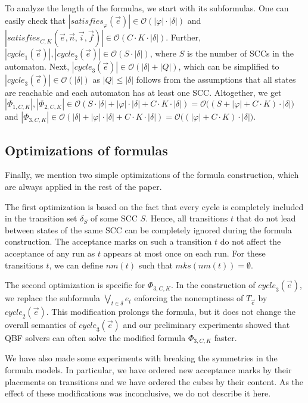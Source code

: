 \documentclass[a4paper,UKenglish,cleveref,autoref,thm-restate]{lipics-v2021}
\newcommand{\mks}{\mathit{mks}}
\newcommand{\rem}{\mathit{nm}}
\newcommand{\mcycle}{\mathit{cycle}}
\newcommand{\msat}{\mathit{satisfies}}
\newcommand{\Te}{T_{\vec{e}}}
\newcommand{\bigO}{\mathcal{O}}
\begin{document}
To analyze the length of the formulas, we start with its subformulas.
One can easily check that
$|\msat_\varphi(\vec{e})|\in\bigO(|\varphi|\cdot|\delta|)$ and
$|\msat_{C,K}(\vec{e},\vec{n},\vec{i},\vec{f})|\in\bigO(C\cdot
K\cdot|\delta|)$. Further,
$|\mcycle_1(\vec{e})|,|\mcycle_2(\vec{e})|\in\bigO(S\cdot|\delta|)$, %
where $S$ is the number of SCCs in the automaton.  Next,
$|\mcycle_3(\vec{e})|\in\bigO(|\delta|+|Q|)$, which can be simplified
to $|\mcycle_3(\vec{e})|\in\bigO(|\delta|)$ as $|Q|\le|\delta|$
follows from the assumptions that all states are reachable and each
automaton has at least one SCC. Altogether, we get
$|\Phi_{1,C,K}|,|\Phi_{2,C,K}|\in\bigO(S\cdot|\delta|+|\varphi|\cdot|\delta|+C\cdot
K\cdot|\delta|)=\bigO\big((S+|\varphi|+C\cdot K)\cdot|\delta|\big)$
and
$|\Phi_{3,C,K}|\in\bigO(|\delta|+|\varphi|\cdot|\delta|+C\cdot
K\cdot|\delta|)=\bigO\big((|\varphi|+C\cdot K)\cdot|\delta|\big)$.

\subsection{Optimizations of formulas}

Finally, we mention two simple optimizations of the formula
construction, which are always applied in the rest of the paper.

The first optimization is based on the fact that every cycle is
completely included in the transition set $\delta_S$ of some SCC
$S$. Hence, all transitions $t$ that do not lead between states of the
same SCC can be completely ignored during the formula
construction. The acceptance marks on such a transition $t$ do not
affect the acceptance of any run as $t$ appears at most once on each
run. For these transitions $t$, we can define $\rem(t)$ such that
$\mks(\rem(t))=\emptyset$.

The second optimization is specific for $\Phi_{3,C,K}$. In the
construction of $\mcycle_3(\vec{e})$, we replace the subformula
$\bigvee_{t\in\delta}e_t$ enforcing the nonemptiness of $\Te$ by
$\mcycle_2(\vec{e})$. This modification prolongs the formula, but it
does not change the overall semantics of $\mcycle_3(\vec{e})$ and our
preliminary experiments showed that QBF solvers can often solve the
modified formula $\Phi_{3,C,K}$ faster.

We have also made some experiments with breaking the symmetries in the
formula models. In particular, we have ordered new acceptance marks by
their placements on transitions and we have ordered the cubes by their
content. As the effect of these modifications was inconclusive, we do
not describe it here.
\end{document}
